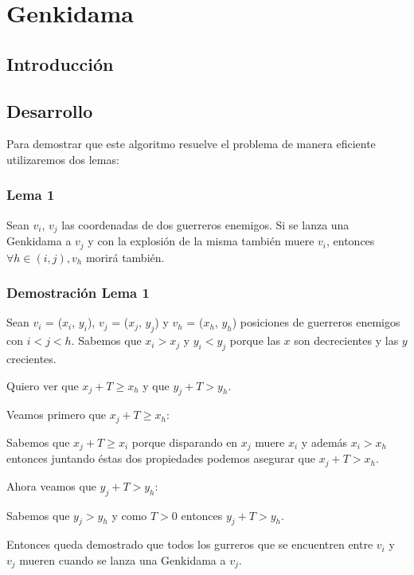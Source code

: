 \section{Genkidama}

	\subsection{Introducción}

	
    \subsection{Desarrollo}
    	
    	Para demostrar que este algoritmo resuelve el problema de manera eficiente utilizaremos dos lemas:
    		\subsubsection*{Lema 1}

    			Sean $v_{i}$, $v_{j}$ las coordenadas de dos guerreros enemigos. Si se lanza una Genkidama a $v_{j}$ y con la explosión de la misma también muere $v_{i}$, entonces $ \forall h \in (i,j), v_{h}$ morirá también. 

    		\subsubsection*{Demostración Lema 1}

    			Sean $v_{i}$ = ($x_{i}$, $y_{i}$), $v_{j}$ = ($x_{j}$, $y_{j}$) y $v_{h}$ = ($x_{h}$, $y_{h}$) posiciones de guerreros enemigos con $i < j < h$.
    			Sabemos que $x_{i} > x_{j}$ y $y_{i} < y_{j}$ porque las $x$ son decrecientes y las $y$ crecientes.

    			Quiero ver que $x_{j} + T \geqslant x_{h}$ y que $y_{j} + T > y_{h}$.

    			Veamos primero que $x_{j} + T \geqslant x_{h}$:

    			Sabemos que $x_{j} + T \geqslant x_{i}$ porque disparando en $x_{j}$ muere $x_{i}$ y además $x_{i} > x_{h}$ entonces juntando éstas dos propiedades podemos asegurar que $x_{j} + T > x_{h}$.

    			Ahora veamos que $y_{j} + T > y_{h}$:

    			Sabemos que $y_{j} > y_{h}$ y como $T > 0$ entonces $y_{j} + T > y_{h}$.

    			Entonces queda demostrado que todos los gurreros que se encuentren entre $v_{i}$ y $v_{j}$ mueren cuando se lanza una Genkidama a $v_{j}$.

